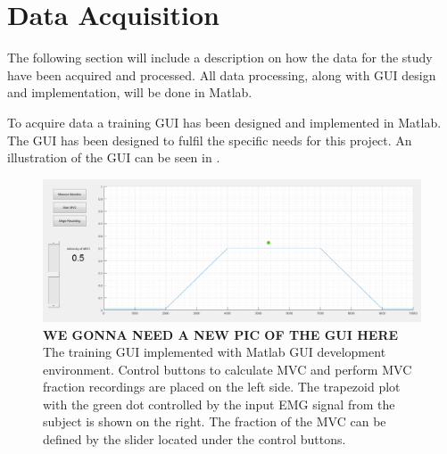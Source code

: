 \section{Data Acquisition}

The following section will include a description on how the data for the study have been acquired and processed. All data processing, along with GUI design and implementation, will be done in Matlab.

To acquire data a training GUI has been designed and implemented in Matlab. The GUI has been designed to fulfil the specific needs for this project. An illustration of the GUI can be seen in . 

\begin{figure}[H]
	\includegraphics[width=.4\textwidth]{figures/GUI/GUI_Training.png}  %
	\caption{\textbf{WE GONNA NEED A NEW PIC OF THE GUI HERE} The training GUI implemented with Matlab GUI development environment. Control buttons to calculate MVC and perform MVC fraction recordings are placed on the left side. The trapezoid plot with the green dot controlled by the input EMG signal from the subject is shown on the right. The fraction of the MVC can be defined by the slider located under the control buttons.}
	\label{fig:GUI_Training}
\end{figure} 

